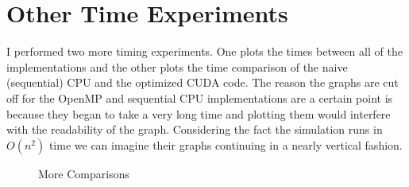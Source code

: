 \section{Other Time Experiments}
\indent I performed two more timing experiments. One plots the times between all of the implementations and the other plots the time comparison of the naive (sequential) CPU and the optimized CUDA code. The reason the graphs are cut off for the OpenMP and sequential CPU implementations are a certain point is because they began to take a very long time and plotting them would interfere with the readability of the graph. Considering the fact the simulation runs in $O(n^2)$ time we can imagine their graphs continuing in a nearly vertical fashion.
\begin{figure}[H]%
    \centering
    \qquad
    \caption{More Comparisons}%
    \label{fig:moar graphszzzz}%
    \cite{Mao_2022}
\end{figure}

